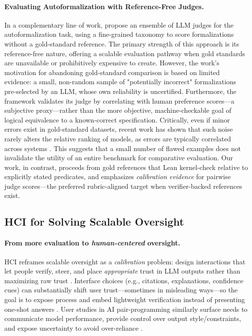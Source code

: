 \documentclass{article}
\begin{document}
\paragraph{Evaluating Autoformalization with Reference-Free Judges.}
In a complementary line of work, \citet{zhang2025goldstandardsepistemicensemble} propose an ensemble of LLM judges for the autoformalization task, using a fine-grained taxonomy to score formalizations without a gold-standard reference.
The primary strength of this approach is its reference-free nature, offering a scalable evaluation pathway when gold standards are unavailable or prohibitively expensive to create.
However, the work's motivation for abandoning gold-standard comparison is based on limited evidence: a small, non-random sample of "potentially incorrect" formalizations pre-selected by an LLM, whose own reliability is uncertified.
Furthermore, the framework validates its judge by correlating with human preference scores—a subjective proxy—rather than the more objective, machine-checkable goal of logical equivalence to a known-correct specification.
Critically, even if minor errors exist in gold-standard datasets, recent work has shown that such noise rarely alters the relative ranking of models, as errors are typically correlated across systems \citep{salaudeen2024imagenot}.
This suggests that a small number of flawed examples does not invalidate the utility of an entire benchmark for comparative evaluation.
Our work, in contrast, proceeds from gold references that Lean kernel-check relative to explicitly stated predicates, and emphasizes \emph{calibration evidence} for pairwise judge scores---the preferred rubric-aligned target when verifier-backed references exist.

\subsection{HCI for Solving Scalable Oversight}

\paragraph{From more evaluation to \emph{human-centered} oversight.}
HCI reframes scalable oversight as a \emph{calibration} problem: design interactions that let people verify, steer, and place \emph{appropriate} trust in LLM outputs rather than maximizing raw trust \citep{bach2022trusthci}. Interface choices (e.g., citations, explanations, confidence cues) can substantially shift user trust---sometimes in misleading ways---so the goal is to expose process and embed lightweight verification instead of presenting one-shot answers \citep{ding2025citations}. User studies in AI pair-programming similarly surface needs to communicate model performance, provide control over output style/constraints, and expose uncertainty to avoid over-reliance \citep{wang2024trustcode}.%
\end{document}
